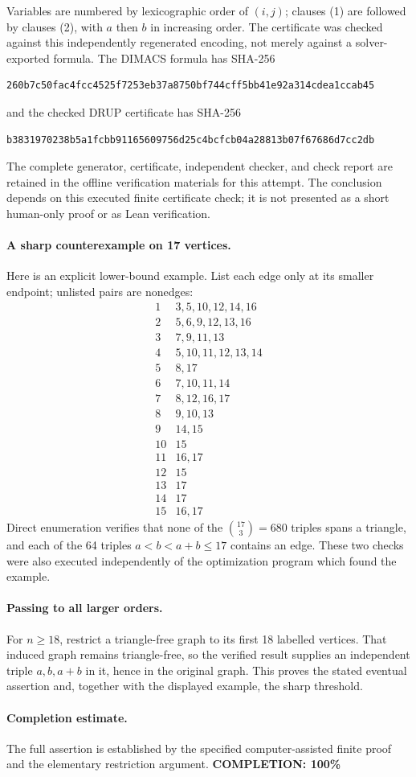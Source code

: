 Variables are numbered by lexicographic order of \((i,j)\);
clauses (1) are followed by clauses (2), with \(a\) then \(b\)
in increasing order. The certificate was checked against
this independently regenerated encoding, not merely against
a solver-exported formula.
The DIMACS formula has SHA-256
\begin{verbatim}
260b7c50fac4fcc4525f7253eb37a8750bf744cff5bb41e92a314cdea1ccab45
\end{verbatim}
and the checked DRUP certificate has SHA-256
\begin{verbatim}
b3831970238b5a1fcbb91165609756d25c4bcfcb04a28813b07f67686d7cc2db
\end{verbatim}
The complete generator, certificate, independent checker,
and check report are retained in the offline verification
materials for this attempt. The conclusion depends on this
executed finite certificate check; it is not presented as
a short human-only proof or as Lean verification.

\paragraph{A sharp counterexample on 17 vertices.}
Here is an explicit lower-bound example. List each edge
only at its smaller endpoint; unlisted pairs are nonedges:
\[
\begin{array}{c|l}
1&3,5,10,12,14,16\\
2&5,6,9,12,13,16\\
3&7,9,11,13\\
4&5,10,11,12,13,14\\
5&8,17\\
6&7,10,11,14\\
7&8,12,16,17\\
8&9,10,13\\
9&14,15\\
10&15\\
11&16,17\\
12&15\\
13&17\\
14&17\\
15&16,17
\end{array}
\]
Direct enumeration verifies that none of the
\(\binom{17}{3}=680\) triples spans a triangle, and each
of the 64 triples \(a<b<a+b\leq17\) contains an edge.
These two checks were also executed independently of the
optimization program which found the example.

\paragraph{Passing to all larger orders.}
For \(n\geq18\), restrict a triangle-free graph to its
first 18 labelled vertices. That induced graph remains
triangle-free, so the verified result supplies an
independent triple \(a,b,a+b\) in it, hence in the original
graph. This proves the stated eventual assertion and,
together with the displayed example, the sharp threshold.

\paragraph{Completion estimate.}
The full assertion is established by the specified
computer-assisted finite proof and the elementary restriction argument.
\textbf{COMPLETION: 100\%}
